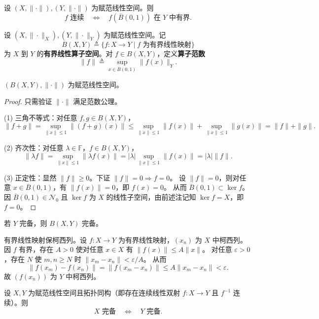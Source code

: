 \documentclass[lang=cn,a4paper,newtx,section]{elegantbook}
\begin{document}
\begin{remark}
  设 $(X,\|\cdot\|),(Y,\|\cdot\|)$ 为赋范线性空间。则
  \[
    f\text{ 连续}\quad\Longleftrightarrow\quad f(\overline{B}(0,1))\text{ 在 }Y\text{ 中有界}.
  \]
\end{remark}

\begin{definition}
  设 $(X,\|\cdot\|_X),(Y,\|\cdot\|_Y)$ 为赋范线性空间。记
  \[
    B(X,Y)\triangleq\{f:X\to Y\mid f\text{ 为有界线性映射}\}
  \]
  为 $X$ 到 $Y$ 的\textbf{有界线性算子空间}。对 $f\in B(X,Y)$，定义\textbf{算子范数}
  \[
    \|f\|\triangleq\sup_{x\in\overline{B}(0,1)}\|f(x)\|_Y.
  \]
\end{definition}

\begin{proposition}
  $(B(X,Y),\|\cdot\|)$ 为赋范线性空间。
\end{proposition}

\begin{proof}
  只需验证 $\|\cdot\|$ 满足范数公理。

  (1) 三角不等式：对任意 $f,g\in B(X,Y)$，
  \[
    \|f+g\|=\sup_{\|x\|\le 1}\|(f+g)(x)\|\le\sup_{\|x\|\le 1}\|f(x)\|+\sup_{\|x\|\le 1}\|g(x)\|=\|f\|+\|g\|.
  \]

  (2) 齐次性：对任意 $\lambda\in\mathbb{F}$，$f\in B(X,Y)$，
  \[
    \|\lambda f\|=\sup_{\|x\|\le 1}\|\lambda f(x)\|=|\lambda|\sup_{\|x\|\le 1}\|f(x)\|=|\lambda|\|f\|.
  \]

  (3) 正定性：显然 $\|f\|\ge 0$。下证 $\|f\|=0\Rightarrow f=0$。
  设 $\|f\|=0$，则对任意 $x\in\overline{B}(0,1)$，有 $\|f(x)\|=0$，即 $f(x)=0$。
  从而 $\overline{B}(0,1)\subset\ker f$。
  因 $\overline{B}(0,1)\in\mathcal{N}_0$ 且 $\ker f$ 为 $X$ 的线性子空间，由前述注记知 $\ker f=X$，即 $f=0$。
\end{proof}

\begin{proposition}
  若 $Y$ 完备，则 $B(X,Y)$ 完备。
\end{proposition}

\begin{remark}
  有界线性映射保柯西列。设 $f:X\to Y$ 为有界线性映射，$(x_n)$ 为 $X$ 中柯西列。
  因 $f$ 有界，存在 $A>0$ 使对任意 $x\in X$ 有 $\|f(x)\|\le A\|x\|$。
  对任意 $\varepsilon>0$，存在 $N$ 使 $m,n\ge N$ 时 $\|x_m-x_n\|<\varepsilon/A$。
  从而
  \[
    \|f(x_m)-f(x_n)\|=\|f(x_m-x_n)\|\le A\|x_m-x_n\|<\varepsilon.
  \]
  故 $(f(x_n))$ 为 $Y$ 中柯西列。
\end{remark}

\begin{proposition}
  设 $X,Y$ 为赋范线性空间且拓扑同构（即存在连续线性双射 $f:X\to Y$ 且 $f^{-1}$ 连续）。则
  \[
    X\text{ 完备}\quad\Longleftrightarrow\quad Y\text{ 完备}.
  \]
\end{proposition}
\end{document}
